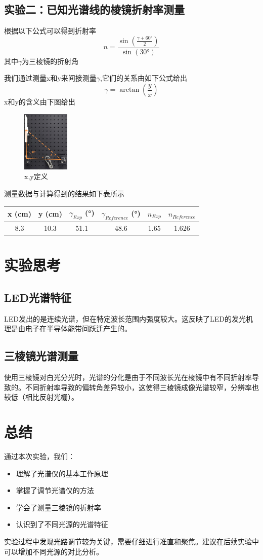 \documentclass{ctexart}
\begin{document}
\subsection{实验二：已知光谱线的棱镜折射率测量}
根据以下公式可以得到折射率
\begin{equation}
    n = \frac{\sin(\frac{\gamma + 60°}{2})}{\sin(30°)}
\end{equation}
其中$\gamma$为三棱镜的折射角

我们通过测量x和y来间接测量$\gamma$,它们的关系由如下公式给出
\begin{equation}
    \gamma = \arctan(\frac{y}{x})
\end{equation}
x和y的含义由下图给出
\begin{figure}[H]
    \centering
    \includegraphics[width=0.2\textwidth,height=0.3\textwidth]{pictures/xy示意图.png}
    \caption{x,y定义}
\end{figure}
测量数据与计算得到的结果如下表所示
\begin{table}[h]
    \centering
    \begin{tabular}{|c|c|c|c|c|c|}
        \hline
        \rowcolor{yellow!25} x (cm) & y (cm) & $\gamma_{Exp}$ (°) & $\gamma_{Reference}$ (°) & $n_{Exp}$  & $n_{Reference}$  \\
        \hline
        8.3 & 10.3 & 51.1 & 48.6 & 1.65 & 1.626 \\
        \hline
    \end{tabular}
\end{table}
\section{实验思考}

\subsection{LED光谱特征}
LED发出的是连续光谱，但在特定波长范围内强度较大。这反映了LED的发光机理是由电子在半导体能带间跃迁产生的。

\subsection{三棱镜光谱测量}
使用三棱镜对白光分光时，光谱的分化是由于不同波长光在棱镜中有不同折射率导致的。不同折射率导致的偏转角差异较小，这使得三棱镜成像光谱较窄，分辨率也较低（相比反射光栅）。

\section{总结}

通过本次实验，我们：
\begin{itemize}
    \item 理解了光谱仪的基本工作原理
    \item 掌握了调节光谱仪的方法
    \item 学会了测量三棱镜的折射率
    \item 认识到了不同光源的光谱特征
\end{itemize}

实验过程中发现光路调节较为关键，需要仔细进行准直和聚焦。建议在后续实验中可以增加不同光源的对比分析。
\end{document}
